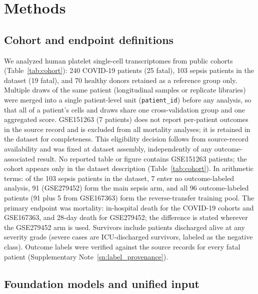 \section{Methods}
\label{sec:methods}

\subsection{Cohort and endpoint definitions}
\label{ssec:methods_cohort}

We analyzed human platelet single-cell transcriptomes from public cohorts
(Table~\ref{tab:cohort}): 240 COVID-19 patients (25 fatal), 103 sepsis
patients in the dataset (19 fatal), and 70 healthy donors retained as a
reference group only. Multiple draws of the same patient (longitudinal samples
or replicate libraries) were merged into a single patient-level unit
(\texttt{patient\_id}) before any analysis, so that all of a patient's cells
and draws share one cross-validation group and one aggregated score.
GSE151263 (7 patients) does not report per-patient outcomes in the source
record and is excluded from all mortality analyses; it is retained in the
dataset for completeness. This eligibility decision follows from source-record
availability and was fixed at dataset assembly, independently of any
outcome-associated result. No reported table or figure contains GSE151263
patients; the cohort appears only in the dataset description
(Table~\ref{tab:cohort}). In arithmetic terms: of the 103 sepsis patients in
the dataset, 7 enter no outcome-labeled analysis, 91 (GSE279452) form the
main sepsis arm, and all 96 outcome-labeled patients (91 plus 5 from
GSE167363) form the reverse-transfer training pool.
The primary endpoint was mortality: in-hospital
death for the COVID-19 cohorts and GSE167363, and 28-day death for GSE279452;
the difference is stated wherever the GSE279452 arm is used. Survivors
include patients discharged alive at any severity grade (severe cases are
ICU-discharged survivors, labeled as the negative class). Outcome labels were
verified against the source records for every fatal patient
(Supplementary Note~\ref{sn:label_provenance}).

\subsection{Foundation models and unified input}
\label{ssec:methods_models}

